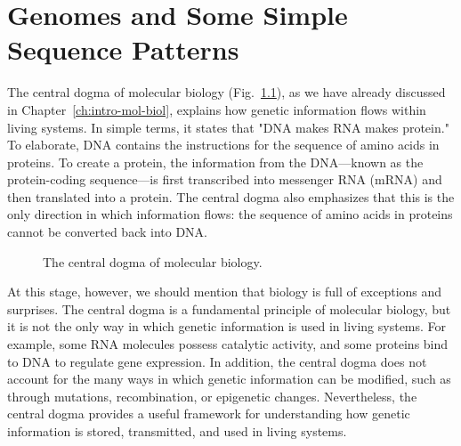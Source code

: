 \chapter{Genomes and Some Simple Sequence Patterns}
\label{ch:genome}

The central dogma of molecular biology (Fig.~\ref{fig:g-central-dogma-genome}), as we have already discussed in Chapter~\ref{ch:intro-mol-biol}, explains how genetic information flows within living systems. In simple terms, it states that "DNA makes RNA makes protein." To elaborate, DNA contains the instructions for the sequence of amino acids in proteins. To create a protein, the information from the DNA—known as the protein-coding sequence—is first transcribed into messenger RNA (mRNA) and then translated into a protein. The central dogma also emphasizes that this is the only direction in which information flows: the sequence of amino acids in proteins cannot be converted back into DNA.

\begin{figure}
  \caption[6pt]{The central dogma of molecular biology.}
  \label{fig:g-central-dogma-genome}
\end{figure}

At this stage, however, we should mention that biology is full of exceptions and surprises. The central dogma is a fundamental principle of molecular biology, but it is not the only way in which genetic information is used in living systems. For example, some RNA molecules possess catalytic activity, and some proteins bind to DNA to regulate gene expression. In addition, the central dogma does not account for the many ways in which genetic information can be modified, such as through mutations, recombination, or epigenetic changes. Nevertheless, the central dogma provides a useful framework for understanding how genetic information is stored, transmitted, and used in living systems.

